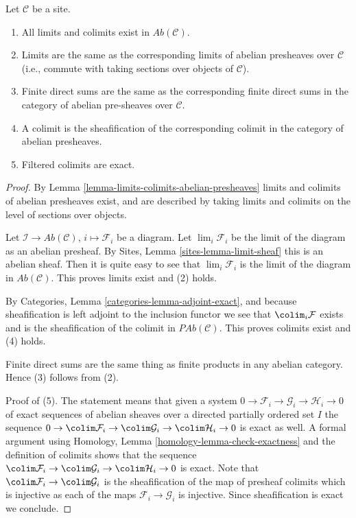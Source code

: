 \begin{lemma}
\label{lemma-limits-colimits-abelian-sheaves}
Let $\mathcal{C}$ be a site.
\begin{enumerate}
\item All limits and colimits exist in $\textit{Ab}(\mathcal{C})$.
\item Limits are the same as the corresponding limits of abelian presheaves
over $\mathcal{C}$ (i.e., commute with taking sections over objects of
$\mathcal{C}$).
\item Finite direct sums are the same as the corresponding finite direct sums
in the category of abelian pre-sheaves over $\mathcal{C}$.
\item A colimit is the sheafification of the corresponding colimit in
the category of abelian presheaves.
\item Filtered colimits are exact.
\end{enumerate}
\end{lemma}

\begin{proof}
By Lemma \ref{lemma-limits-colimits-abelian-presheaves} limits and colimits
of abelian presheaves exist, and are described by taking limits and colimits
on the level of sections over objects.

\medskip\noindent
Let $\mathcal{I} \to \textit{Ab}(\mathcal{C})$, $i \mapsto \mathcal{F}_i$
be a diagram. Let $\lim_i \mathcal{F}_i$ be the limit of the diagram
as an abelian presheaf. By Sites, Lemma \ref{sites-lemma-limit-sheaf}
this is an abelian sheaf. Then it is quite easy to see that
$\lim_i \mathcal{F}_i$ is the limit of the diagram in
$\textit{Ab}(\mathcal{C})$. This proves limits exist and (2) holds.

\medskip\noindent
By Categories, Lemma \ref{categories-lemma-adjoint-exact}, and because
sheafification is left adjoint to the inclusion functor we see that
$\colim_i \mathcal{F}$ exists and is the sheafification of the colimit
in $\textit{PAb}(\mathcal{C})$. This proves colimits exist and (4) holds.

\medskip\noindent
Finite direct sums are the same thing as finite products in any abelian
category. Hence (3) follows from (2).

\medskip\noindent
Proof of (5). The statement means that given a system
$0 \to \mathcal{F}_i \to \mathcal{G}_i \to \mathcal{H}_i \to 0$
of exact sequences of abelian sheaves over a directed partially
ordered set $I$ the sequence
$0 \to \colim \mathcal{F}_i \to \colim \mathcal{G}_i \to
\colim \mathcal{H}_i \to 0$ is exact as well. A formal argument using
Homology, Lemma \ref{homology-lemma-check-exactness} and the
definition of colimits shows that the sequence
$\colim \mathcal{F}_i \to \colim \mathcal{G}_i \to \colim \mathcal{H}_i \to 0$
is exact. Note that $\colim \mathcal{F}_i \to \colim \mathcal{G}_i$
is the sheafification of the map of presheaf colimits which is
injective as each of the maps $\mathcal{F}_i \to \mathcal{G}_i$ is
injective. Since sheafification is exact we conclude.
\end{proof}







